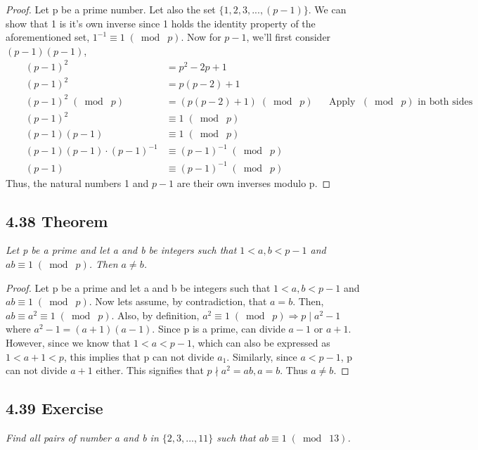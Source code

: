 \documentclass{article}
\begin{document}
\begin{proof}
Let p be a prime number. Let also the set $\{1,2,3,...,(p-1)\}$. We can show that 1 is it's own inverse since 1 holds the identity property of the aforementioned set, $1^{-1} \equiv 1 \;(\bmod\; p)$. Now for $p-1$, we'll first consider $(p-1)(p-1)$,
\begin{align*}
    && (p-1)^2 &= p^2 -2p + 1 &&\\
    && (p-1)^2 &= p(p - 2) + 1 &&\\
    && (p-1)^2 \;(\bmod\; p) &= (p(p - 2) + 1) \;(\bmod\; p)&& \text{Apply $\;(\bmod\; p)$ in both sides}\\
    && (p-1)^2 &\equiv 1 \;(\bmod\; p)&&\\
    && (p-1)(p-1) &\equiv 1 \;(\bmod\; p)&&\\
    && (p-1)(p-1)\cdot(p-1)^{-1} &\equiv (p-1)^{-1} \;(\bmod\; p)&&\\
    && (p-1) &\equiv (p-1)^{-1} \;(\bmod\; p)&&
\end{align*}
Thus, the natural numbers 1 and $p-1$ are their own inverses modulo p.
\end{proof}

\subsection*{4.38 Theorem} 
\quad \textit{Let p be a prime and let a and b be integers such that $1 < a, b < p-1$ and $ab \equiv 1 \;(\bmod\; p)$. Then $a \neq b$.}

\begin{proof}
Let p be a prime and let a and b be integers such that $1 < a, b < p-1$ and $ab \equiv 1 \;(\bmod\; p)$. Now lets assume, by contradiction, that $a = b$. Then, $ab \equiv a^2 \equiv 1 \;(\bmod\; p)$. Also, by definition, $a^2 \equiv 1 \;(\bmod\; p) \Longrightarrow p \mid a^2 -1$ where $a^2-1 = (a+1)(a-1)$. Since p is a prime, can divide $a-1$ or $a+1$.\\
However, since we know that $1 < a < p-1$, which can also be expressed as $1 < a + 1< p$, this implies that p can not divide $a_1$. Similarly, since $a < p-1$, p can not divide $a+1$ either. This signifies that $p \nmid a^2 = ab, a = b$. Thus $a \neq b$. 
\end{proof}

\subsection*{4.39 Exercise} 
\quad \textit{Find all pairs of number a and b in $\{2,3,...,11\}$ such that $ab \equiv 1 \;(\bmod\; 13)$.}
\end{document}
